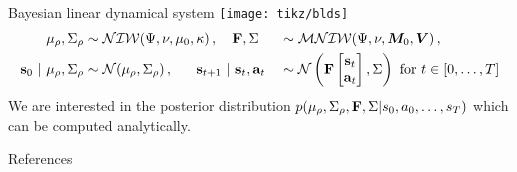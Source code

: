 \documentclass[10pt, compress]{beamer}
\begin{document}
\begin{frame}{Bayesian linear dynamical system}
	\pause
	\centering
	\texttt{[image: tikz/blds]}
	\begin{alignat*}{3}
		\mu_{\rho},\Sigma_{\rho}&\sim\mathcal{NIW}(\Psi,\nu,\mu_0,\kappa)\,,~~~\mathbf{F},\Sigma&&\sim\mathcal{MNIW}(\Psi,\nu,\bm{M}_0,\bm{V})\,,\\
		\mathbf{s}_0~|~\mu_{\rho},\Sigma_{\rho}&\sim\mathcal{N}(\mu_{\rho}, \Sigma_{\rho})\,,~~~~~\mathbf{s}_{t+1}~|~\mathbf{s}_t,\mathbf{a}_t&&\sim\mathcal{N}\left(\mathbf{F}\begin{bmatrix}\mathbf{s}_t\\\mathbf{a}_t\end{bmatrix},\Sigma\right) \textrm{ for } t \in [0,\ldots,T]
	\end{alignat*}
	\pause
	We are interested in the posterior distribution 
	$
	p(\mu_\rho, \Sigma_\rho, \mathbf{F}, \Sigma | {s_0, a_0, \ldots, s_T})
	$
	which can be computed analytically.
\end{frame}

\begin{frame}[allowframebreaks]{References}
    
     
\end{frame}

\end{document}
